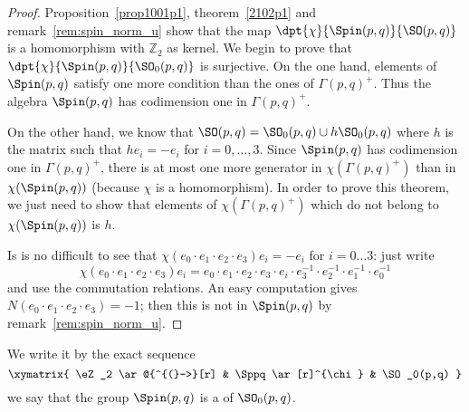 \begin{proof}
	Proposition~\ref{prop1001p1}, theorem~\ref{2102p1} and remark~\ref{rem:spin_norm_u} show that the map $\dpt{\chi}{\Spin(p,q)}{\SO(p,q)}$ is a homomorphism with $\mathbb{Z}_2$ as kernel. We begin to prove that $\dpt{\chi}{\Spin(p,q)}{\SO_0(p,q)}$ is surjective. On the one hand, elements of $\Spin(p,q)$ satisfy one more condition than the ones of $\Gamma(p,q)^+$. Thus the algebra $\Spin(p,q)$ has codimension one in $\Gamma(p,q)^+$.

	On the other hand, we know that $\SO(p,q)=\SO_0(p,q)\cup h\SO_0(p,q)$ where $h$ is the matrix such that $he_i=-e_i$ for $i=0,\ldots,3$. Since $\Spin(p,q)$ has codimension one in $\Gamma(p,q)^+$, there is at most one more generator in $\chi(\Gamma(p,q)^+)$ than in $\chi(\Spin(p,q))$ (because $\chi$ is a homomorphism). In order to prove this theorem, we just need to show that elements of $\chi(\Gamma(p,q)^+)$ which do not belong to $\chi(\Spin(p,q))$ is $h$.

	Is is no difficult to see that $\chi(e_0\cdot e_1\cdot e_2\cdot e_3)e_i=-e_i$ for $i=0\ldots 3$: just write
	\begin{equation}
		\chi(e_0\cdot e_1\cdot e_2\cdot e_3)e_i=e_0\cdot e_1\cdot e_2\cdot e_3\cdot e_i\cdot e_3^{-1}\cdot e_2^{-1}\cdot e_1^{-1}\cdot e_0^{-1}
	\end{equation}
	and use the commutation relations. An easy computation gives
	$N(e_0\cdot e_1\cdot e_2\cdot e_3)=-1$; then this is not in $\Spin(p,q)$ by remark~\ref{rem:spin_norm_u}.
\end{proof}

We write it by the exact sequence
\begin{equation}
	\xymatrix{
		\eZ_2  \ar@{^{(}->}[r] & \Sppq \ar[r]^{\chi} & \SO_0(p,q)
	}
\end{equation}
we say that the group $\Spin(p,q)$ is a  of $\SO_0(p,q)$.

